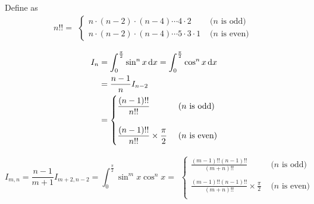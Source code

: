 \begin{theorem}

Define  as
\begin{equation}
    n!! = \begin{aligned}
        \begin{cases}
        n \cdot (n-2) \cdot (n-4) \cdots 4 \cdot 2  & \text{ (} n \text{ is odd)} \\
        n \cdot (n-2) \cdot (n-4) \cdots 5 \cdot 3 \cdot 1  & \text{ (} n \text{ is even)} 
    \end{cases}
    \end{aligned}    
\end{equation}

\begin{equation}
    \begin{aligned}
        I_n &= \int_0^\frac{\pi}{2} \sin^n x \dif x = \int_0^\frac{\pi}{2} \cos^n x \dif x  \\
        &= \frac{n-1}{n} I_{n-2} \\
        &= \begin{cases}
            \displaystyle \frac{(n-1)!!}{n!!} & \text{ (} n \text{ is odd)}\\
            \\
            \displaystyle \frac{(n-1)!!}{n!!} \times \frac{\pi}{2} & \text{ (} n \text{ is even)}
        \end{cases}
    \end{aligned}
\end{equation}

\begin{equation}
    I_{m,n} = \frac{n-1}{m+1} I_{m+2, n-2} = \int_{0}^{\frac{\pi}{2}} \sin^m x \cos^n x = \begin{aligned}
        \begin{cases}
            \displaystyle \frac{(m-1)!! (n-1)!!}{(m+n)!!} & \text{ (} n \text{ is odd)}\\
            \\
            \displaystyle \frac{(m-1)!! (n-1)!!}{(m+n)!!} \times \frac{\pi}{2} & \text{ (} n \text{ is even)}\\
        \end{cases}
    \end{aligned}
\end{equation}

\end{theorem}



